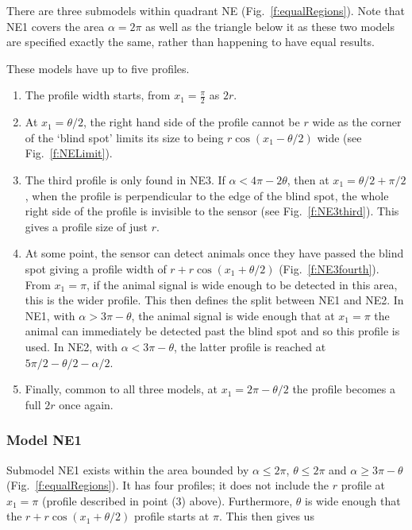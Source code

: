 There are three submodels within quadrant NE (Fig.~\ref{f:equalRegions}). Note that NE1 covers the area $\alpha=2\pi$ as well as the triangle below it as these two models are specified exactly the same, rather than happening to have equal results.

These models have up to five profiles.

\begin{enumerate}
\item The profile width starts, from $x_1=\frac{\pi}{2}$ as $2r$. 
\item At $x_1 = \theta/2$, the right hand side of the profile cannot be $r$ wide as the corner of the `blind spot' limits its size to being $r\cos(x_1 - \theta/2)$ wide (see Fig.~\ref{f:NELimit}). 

\item The third profile is only found in NE3. If $\alpha < 4\pi - 2\theta$, then at $x_1=\theta/2 + \pi/2$, when the profile is perpendicular to the edge of the blind spot, the whole right side of the profile is invisible to the sensor (see Fig.~\ref{f:NE3third}). This gives a profile size of just $r$.

\item At some point, the sensor can detect animals once they have passed the blind spot giving a profile width of $r + r\cos(x_1 + \theta/2)$ (Fig.~\ref{f:NE3fourth}). From $x_1=\pi$, if the animal signal is wide enough to be detected in this area, this is the wider profile. This then defines the split between NE1 and NE2. In NE1, with $\alpha > 3\pi - \theta$, the animal signal is wide enough that at $x_1=\pi$ the animal can immediately be detected past the blind spot and so this profile is used. In NE2, with $\alpha < 3\pi - \theta$, the latter profile is reached at $5\pi/2 - \theta/2 - \alpha/2$. 

\item Finally, common to all three models, at $x_1 = 2\pi - \theta/2$ the profile becomes a full $2r$ once again. \label{NElist5}
\end{enumerate}



\subsubsection{Model NE1} \label{NE1}

Submodel NE1 exists within the area bounded by $\alpha\le2\pi$, $\theta\le2\pi$ and $\alpha \ge 3\pi - \theta$ (Fig.~\ref{f:equalRegions}). It has four profiles; it does not include the $r$ profile at $x_1=\pi$ (profile described in point (3) above). Furthermore, $\theta$ is wide enough that the $r + r\cos(x_1 + \theta/2)$ profile starts at $\pi$. This then gives us


